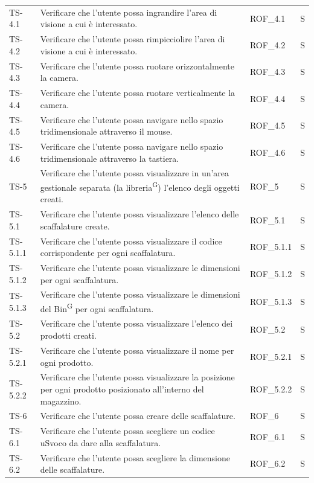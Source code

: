 \begin{xltabular}{0.9\textwidth}{X | p{0.5\textwidth} | X | X}
    TS-4.1 & Verificare che l'utente possa ingrandire l'area di visione a cui è interessato. & ROF\_4.1& S \\
    TS-4.2 & Verificare che l'utente possa rimpicciolire l'area di visione a cui è interessato. &  ROF\_4.2& S \\
    TS-4.3 & Verificare che l'utente possa ruotare orizzontalmente la camera. & ROF\_4.3 & S \\
    TS-4.4 & Verificare che l'utente possa ruotare verticalmente la camera. & ROF\_4.4& S \\
    TS-4.5 & Verificare che l'utente possa navigare nello spazio tridimensionale attraverso il mouse. & ROF\_4.5& S \\
    TS-4.6 & Verificare che l'utente possa navigare nello spazio tridimensionale attraverso la tastiera. & ROF\_4.6& S\\
    TS-5 & Verificare che l'utente possa visualizzare in un'area gestionale separata (la libreria\textsuperscript{G}) l'elenco degli oggetti creati. & ROF\_5& S \\
    TS-5.1 & Verificare che l'utente possa visualizzare l'elenco delle scaffalature create. & ROF\_5.1& S \\
    TS-5.1.1 & Verificare che l'utente possa visualizzare il codice corrispondente per ogni scaffalatura. & ROF\_5.1.1& S \\
    TS-5.1.2 & Verificare che l'utente possa visualizzare le dimensioni per ogni scaffalatura.& ROF\_5.1.2& S \\
    TS-5.1.3 & Verificare che l'utente possa visualizzare le dimensioni del Bin\textsuperscript{G} per ogni scaffalatura.& ROF\_5.1.3& S\\
    TS-5.2 & Verificare che l'utente possa visualizzare l'elenco dei prodotti creati. & ROF\_5.2& S \\
    TS-5.2.1 & Verificare che l'utente possa visualizzare il nome per ogni prodotto. & ROF\_5.2.1  & S \\
    TS-5.2.2 & Verificare che l'utente possa visualizzare la posizione per ogni prodotto posizionato all'interno del magazzino. & ROF\_5.2.2& S\\
    TS-6 & Verificare che l'utente possa creare delle scaffalature. & ROF\_6& S\\
    TS-6.1 & Verificare che l'utente possa scegliere un codice uSvoco da dare alla scaffalatura. & ROF\_6.1& S\\
    TS-6.2 &Verificare che l'utente possa scegliere la dimensione delle scaffalature. & ROF\_6.2& S\\

\end{xltabular}
